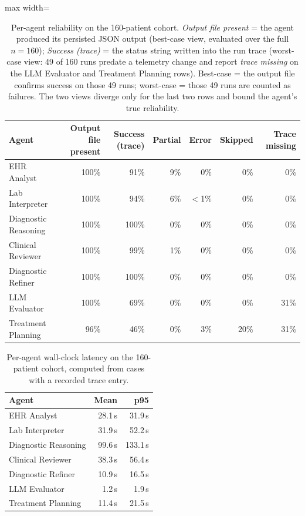 \begin{table}[!htbp]
\centering
\caption{Per-agent reliability on the 160-patient cohort. \emph{Output
file present} = the agent produced its persisted JSON output
(best-case view, evaluated over the full $n = 160$); \emph{Success
(trace)} = the status string written into the run trace (worst-case
view: 49 of 160 runs predate a telemetry change and report
\emph{trace missing} on the LLM Evaluator and Treatment Planning
rows). Best-case = the output file confirms success on those 49
runs; worst-case = those 49 runs are counted as failures. The two
views diverge only for the last two rows and bound the agent's true
reliability.}
\label{tab:agent_reliability}
\footnotesize
\begin{adjustbox}{max width=\textwidth}
\begin{tabular}{@{}lrrrrrr@{}}
\toprule
\textbf{Agent} & \textbf{Output file present} & \textbf{Success (trace)} & \textbf{Partial} & \textbf{Error} & \textbf{Skipped} & \textbf{Trace missing} \\
\midrule
EHR Analyst              & 100\% & 91\%  &  9\%  & 0\%   &  0\%   & 0\%   \\
Lab Interpreter          & 100\% & 94\%  &  6\%  & $<$1\%& 0\%    & 0\%   \\
Diagnostic Reasoning     & 100\% & 100\% &  0\%  & 0\%   &  0\%   & 0\%   \\
Clinical Reviewer        & 100\% & 99\%  &  1\%  & 0\%   &  0\%   & 0\%   \\
Diagnostic Refiner       & 100\% & 100\% &  0\%  & 0\%   &  0\%   & 0\%   \\
LLM Evaluator            & 100\% & 69\%  &  0\%  & 0\%   &  0\%   & 31\%  \\
Treatment Planning       & 96\%  & 46\%  &  0\%  & 3\%   & 20\%   & 31\%  \\
\bottomrule
\end{tabular}
\end{adjustbox}
\end{table}

\begin{table}[!htbp]
\centering
\caption{Per-agent wall-clock latency on the 160-patient cohort,
computed from cases with a recorded trace entry.}
\label{tab:agent_latency}
\small
\begin{tabular}{@{}lrr@{}}
\toprule
\textbf{Agent} & \textbf{Mean} & \textbf{p95} \\
\midrule
EHR Analyst              & 28.1\,s &  31.9\,s \\
Lab Interpreter          & 31.9\,s &  52.2\,s \\
Diagnostic Reasoning     & 99.6\,s & 133.1\,s \\
Clinical Reviewer        & 38.3\,s &  56.4\,s \\
Diagnostic Refiner       & 10.9\,s &  16.5\,s \\
LLM Evaluator            &  1.2\,s &   1.9\,s \\
Treatment Planning       & 11.4\,s &  21.5\,s \\
\bottomrule
\end{tabular}
\end{table}


